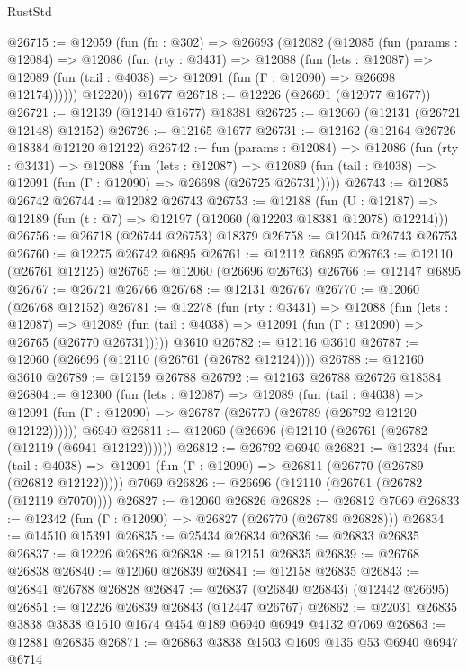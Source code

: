 \begin{lexlean}{RustStd}
\begin{coremodule}
@26715 := @12059
    (fun (fn : @302) =>
    @26693
      (@12082
        (@12085
          (fun (params : @12084) =>
          @12086
            (fun (rty : @3431) =>
            @12088
              (fun (lets : @12087) =>
              @12089 (fun (tail : @4038) => @12091 (fun (Γ : @12090) => @26698 @12174))))))
        @12220))
    @1677
@26718 := @12226 (@26691 (@12077 @1677))
@26721 := @12139 (@12140 @1677) @18381
@26725 := @12060 (@12131 (@26721 @12148) @12152)
@26726 := @12165 @1677
@26731 := @12162 (@12164 @26726 @18384 @12120 @12122)
@26742 := fun (params : @12084) =>
  @12086
    (fun (rty : @3431) =>
    @12088
      (fun (lets : @12087) =>
      @12089 (fun (tail : @4038) => @12091 (fun (Γ : @12090) => @26698 (@26725 @26731)))))
@26743 := @12085 @26742
@26744 := @12082 @26743
@26753 := @12188
    (fun (U : @12187) => @12189 (fun (t : @7) => @12197 (@12060 (@12203 @18381 @12078) @12214)))
@26756 := @26718 (@26744 @26753) @18379
@26758 := @12045 @26743 @26753
@26760 := @12275 @26742 @6895
@26761 := @12112 @6895
@26763 := @12110 (@26761 @12125)
@26765 := @12060 (@26696 @26763)
@26766 := @12147 @6895
@26767 := @26721 @26766
@26768 := @12131 @26767
@26770 := @12060 (@26768 @12152)
@26781 := @12278
    (fun (rty : @3431) =>
    @12088
      (fun (lets : @12087) =>
      @12089 (fun (tail : @4038) => @12091 (fun (Γ : @12090) => @26765 (@26770 @26731)))))
    @3610
@26782 := @12116 @3610
@26787 := @12060 (@26696 (@12110 (@26761 (@26782 @12124))))
@26788 := @12160 @3610
@26789 := @12159 @26788
@26792 := @12163 @26788 @26726 @18384
@26804 := @12300
    (fun (lets : @12087) =>
    @12089
      (fun (tail : @4038) =>
      @12091 (fun (Γ : @12090) => @26787 (@26770 (@26789 (@26792 @12120 @12122))))))
    @6940
@26811 := @12060 (@26696 (@12110 (@26761 (@26782 (@12119 (@6941 @12122))))))
@26812 := @26792 @6940
@26821 := @12324
    (fun (tail : @4038) => @12091 (fun (Γ : @12090) => @26811 (@26770 (@26789 (@26812 @12122)))))
    @7069
@26826 := @26696 (@12110 (@26761 (@26782 (@12119 @7070))))
@26827 := @12060 @26826
@26828 := @26812 @7069
@26833 := @12342 (fun (Γ : @12090) => @26827 (@26770 (@26789 @26828)))
@26834 := @14510 @15391
@26835 := @25434 @26834
@26836 := @26833 @26835
@26837 := @12226 @26826
@26838 := @12151 @26835
@26839 := @26768 @26838
@26840 := @12060 @26839
@26841 := @12158 @26835
@26843 := @26841 @26788 @26828
@26847 := @26837 (@26840 @26843) (@12442 @26695)
@26851 := @12226 @26839 @26843 (@12447 @26767)
@26862 := @22031 @26835 @3838 @3838 @1610 @1674 @454 @189 @6940 @6949 @4132 @7069
@26863 := @12881 @26835
@26871 := @26863 @3838 @1503 @1609 @135 @53 @6940 @6947 @6714

\end{coremodule}
\end{lexlean}
